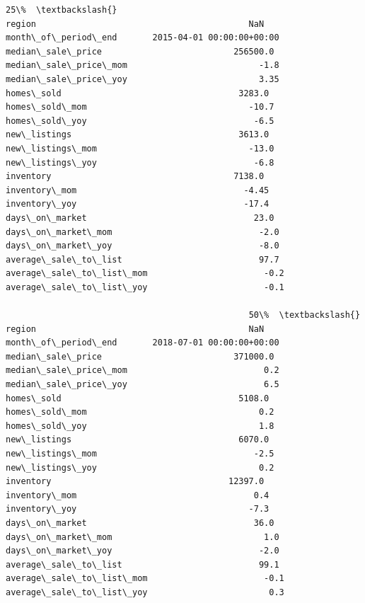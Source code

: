 \documentclass[11pt]{article}
\begin{document}
\begin{tcolorbox}[breakable, size=fbox, boxrule=.5pt, pad at break*=1mm, opacityfill=0]
\begin{Verbatim}[commandchars=\\\{\}]
                                                25\%  \textbackslash{}
region                                          NaN
month\_of\_period\_end       2015-04-01 00:00:00+00:00
median\_sale\_price                          256500.0
median\_sale\_price\_mom                          -1.8
median\_sale\_price\_yoy                          3.35
homes\_sold                                   3283.0
homes\_sold\_mom                                -10.7
homes\_sold\_yoy                                 -6.5
new\_listings                                 3613.0
new\_listings\_mom                              -13.0
new\_listings\_yoy                               -6.8
inventory                                    7138.0
inventory\_mom                                 -4.45
inventory\_yoy                                 -17.4
days\_on\_market                                 23.0
days\_on\_market\_mom                             -2.0
days\_on\_market\_yoy                             -8.0
average\_sale\_to\_list                           97.7
average\_sale\_to\_list\_mom                       -0.2
average\_sale\_to\_list\_yoy                       -0.1

                                                50\%  \textbackslash{}
region                                          NaN
month\_of\_period\_end       2018-07-01 00:00:00+00:00
median\_sale\_price                          371000.0
median\_sale\_price\_mom                           0.2
median\_sale\_price\_yoy                           6.5
homes\_sold                                   5108.0
homes\_sold\_mom                                  0.2
homes\_sold\_yoy                                  1.8
new\_listings                                 6070.0
new\_listings\_mom                               -2.5
new\_listings\_yoy                                0.2
inventory                                   12397.0
inventory\_mom                                   0.4
inventory\_yoy                                  -7.3
days\_on\_market                                 36.0
days\_on\_market\_mom                              1.0
days\_on\_market\_yoy                             -2.0
average\_sale\_to\_list                           99.1
average\_sale\_to\_list\_mom                       -0.1
average\_sale\_to\_list\_yoy                        0.3


\end{Verbatim}
\end{tcolorbox}
\end{document}
